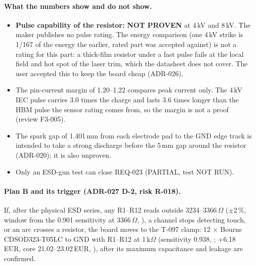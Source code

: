 \paragraph{What the numbers show and do not show.}
\begin{itemize}[noitemsep]
  \item \textbf{Pulse capability of the resistor: NOT PROVEN} at 4\,kV and 8\,kV.
        The maker publishes no pulse rating. The energy comparison (one 4\,kV strike
        is 1/167 of the energy the earlier, rated part was accepted against) is not
        a rating for this part: a thick-film resistor under a fast pulse fails at the
        local field and hot spot of the laser trim, which the datasheet does not
        cover. The user accepted this to keep the board cheap (ADR-026).
  \item The pin-current margin of 1.20--1.22 compares peak current only. The 4\,kV
        IEC pulse carries 3.0 times the charge and lasts 3.6 times longer than the
        HBM pulse the sensor rating comes from, so the margin is not a proof
        (review F3-005).
  \item The spark gap of 1.401\,mm from each electrode pad to the GND edge track is
        intended to take a strong discharge before the 5\,mm gap around the
        resistor (ADR-020); it is also unproven.
  \item Only an ESD-gun test can close REQ-023 (PARTIAL, test NOT RUN).
\end{itemize}

\paragraph{Plan B and its trigger (ADR-027 D-2, risk R-018).} If, after the
physical ESD series, any R1--R12 reads outside 3234--3366\,$\Omega$ ($\pm$2\,\%,
 window from the 0.901 sensitivity at 3366\,$\Omega$,
), a channel stops detecting touch, or an arc crosses a resistor,
the board moves to the T-097 clamp: 12 $\times$ Bourns CDSOD323-T05LC to GND with
R1--R12 at 1\,k$\Omega$ (sensitivity 0.938, ; +6.18\,EUR, core
21.02--23.02\,EUR, ), after its maximum capacitance and leakage
are confirmed.

